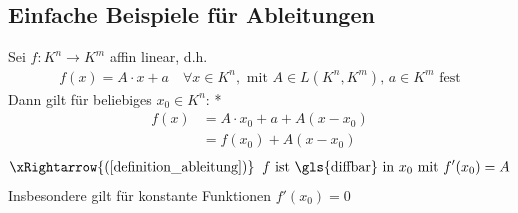 \subsection{Einfache Beispiele für Ableitungen}
\begin{example}
	Sei $f:K^n\to K^m$ affin linear, d.h. \begin{align*}
		f(x) = A\cdot x + a\quad \forall x\in K^n, \text{ mit } A\in L(K^n, K^m), \, a\in K^m \text{ fest}
	\end{align*}
	Dann gilt für beliebiges $x_0\in K^n$:
	\zeroAmsmathAlignVSpaces**
	\begin{align*}
		f(x) &= A\cdot x_0 + a + A(x - x_0) \\
		&=f(x_0) + A(x - x_0)
	\end{align*}
	\zeroAmsmathAlignVSpaces
	\begin{align*}
		\xRightarrow{(\ref{definition_ableitung})}\;\; \text{$f$ ist  \gls{diffbar} in $x_0$ mit } f'(x_0) = A
	\end{align*}
	Insbesondere gilt für konstante Funktionen $f'(x_0) = 0$\\
	\begin{center}\end{center}
\end{example}
